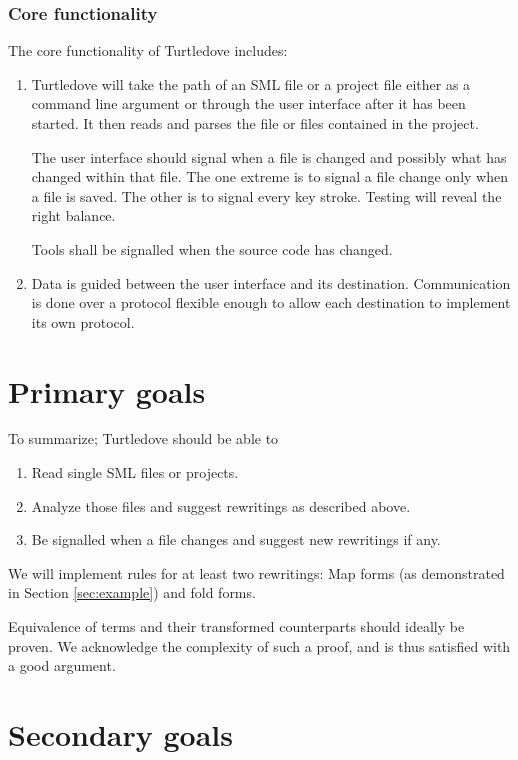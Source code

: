 \documentclass[a4paper,oneside]{article}
\begin{document}
\subsubsection{Core functionality}
The core functionality of Turtledove includes:
\begin{enumerate}
\item Turtledove will take the path of an SML file or a project file either as a command line
  argument or through the user interface after it has been started. It then reads and parses the
  file or files contained in the project.

  The user interface should signal when a file is changed and possibly what has changed within that
  file. The one extreme is to signal a file change only when a file is saved. The other is to signal
  every key stroke. Testing will reveal the right balance.

  Tools shall be signalled when the source code has changed.

\item Data is guided between the user interface and its destination. Communication is done over a
  protocol flexible enough to allow each destination to implement its own protocol.
\end{enumerate}

\section{Primary goals}
To summarize; Turtledove should be able to

\begin{enumerate}
\item Read single SML files or projects.
\item Analyze those files and suggest rewritings as described above.
\item Be signalled when a file changes and suggest new rewritings if any.
\end{enumerate}

We will implement rules for at least two rewritings: Map forms (as demonstrated in Section
\ref{sec:example}) and fold forms.

Equivalence of terms and their transformed counterparts should ideally be proven. We acknowledge the
complexity of such a proof, and is thus satisfied with a good argument.

\section{Secondary goals}
\end{document}
